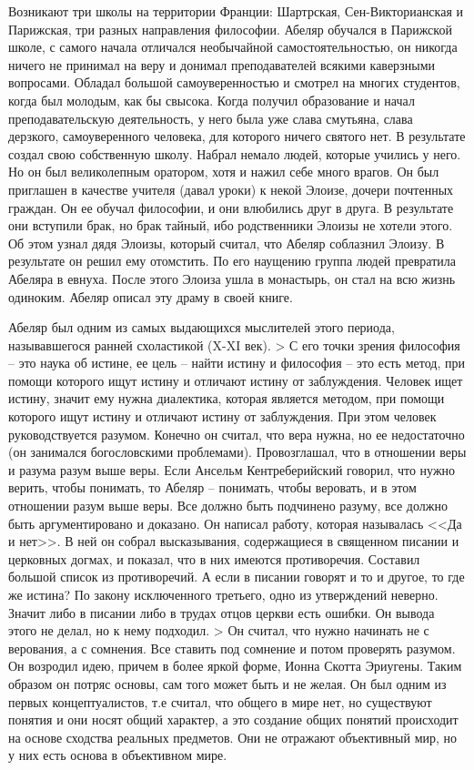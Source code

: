 Возникают три школы на территории Франции: Шартрская, Сен-Викторианская и Парижская, три разных направления философии. Абеляр обучался в Парижской школе, с самого начала отличался необычайной самостоятельностью, он никогда ничего не принимал на веру и донимал преподавателей всякими каверзными вопросами. Обладал большой самоуверенностью и смотрел на многих студентов, когда был молодым, как бы свысока. Когда получил образование и начал преподавательскую деятельность, у него была уже слава смутьяна, слава дерзкого, самоуверенного человека, для которого ничего святого нет. В результате создал свою собственную школу. Набрал немало людей, которые учились у него. Но он был великолепным оратором, хотя и нажил себе много врагов. Он был приглашен в качестве учителя (давал уроки) к некой Элоизе, дочери почтенных граждан. Он ее обучал философии, и они влюбились друг в друга. В результате они вступили брак, но брак тайный, ибо родственники Элоизы не хотели этого. Об этом узнал дядя Элоизы, который считал, что Абеляр соблазнил Элоизу. В результате он решил ему отомстить. По его наущению группа людей превратила Абеляра в евнуха. После этого Элоиза ушла в монастырь, он стал на всю жизнь одиноким. Абеляр описал эту драму в своей книге.

Абеляр был одним из самых выдающихся мыслителей этого периода, называвшегося ранней схоластикой (X-XI век). > С его точки зрения философия – это наука об истине, ее цель – найти истину и философия – это есть метод, при помощи которого ищут истину и отличают истину от заблуждения. Человек ищет истину, значит ему нужна диалектика, которая является методом, при помощи которого ищут истину и отличают истину от заблуждения. При этом человек руководствуется разумом. Конечно он считал, что вера нужна, но ее недостаточно (он занимался богословскими проблемами). Провозглашал, что в отношении веры и разума разум выше веры. Если Ансельм Кентреберийский говорил, что нужно верить, чтобы понимать, то Абеляр – понимать, чтобы веровать, и в этом отношении разум выше веры. Все должно быть подчинено разуму, все должно быть аргументировано и доказано. Он написал работу, которая называлась <<Да и нет>>. В ней он собрал высказывания, содержащиеся в священном писании и церковных догмах, и показал, что в них имеются противоречия. Составил большой список из противоречий. А если в писании говорят и то и другое, то где же истина? По закону исключенного третьего, одно из утверждений неверно. Значит либо в писании либо в трудах отцов церкви есть ошибки. Он вывода этого не делал, но к нему подходил. > Он считал, что нужно начинать не с верования, а с сомнения. Все ставить под сомнение и потом проверять разумом. Он возродил идею, причем в более яркой форме, Ионна Скотта Эриугены. Таким образом он потряс основы, сам того может быть и не желая. Он был одним из первых концептуалистов, т.е считал, что общего в мире нет, но существуют понятия и они носят общий характер, а это создание общих понятий происходит на основе сходства реальных предметов. Они не отражают объективный мир, но у них есть основа в объективном мире.